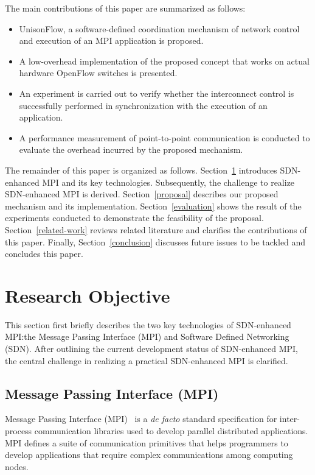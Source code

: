 The main contributions of this paper are summarized as follows:

\begin{itemize}
\item
  UnisonFlow, a software-defined coordination mechanism of network
  control and execution of an MPI application is proposed.
\item
  A low-overhead implementation of the proposed concept that works on
  actual hardware OpenFlow switches is presented.
\item
  An experiment is carried out to verify whether the interconnect
  control is successfully performed in synchronization with the
  execution of an application.
\item
  A performance measurement of point-to-point communication is conducted
  to evaluate the overhead incurred by the proposed mechanism.
\end{itemize}

The remainder of this paper is organized as follows.
Section~\ref{research-objective} introduces SDN-enhanced MPI and its key
technologies. Subsequently, the challenge to realize SDN-enhanced MPI is
derived. Section~\ref{proposal} describes our proposed mechanism and its
implementation. Section~\ref{evaluation} shows the result of the experiments
conducted to demonstrate the feasibility of the proposal.
Section~\ref{related-work} reviews related literature and clarifies the
contributions of this paper. Finally, Section~\ref{conclusion} discusses
future issues to be tackled and concludes this paper.

\hypertarget{research-objective}{%
\section{Research Objective}\label{research-objective}}

This section first briefly describes the two key technologies of
SDN-enhanced MPI:\@ the Message Passing Interface (MPI) and Software
Defined Networking (SDN). After outlining the current development status
of SDN-enhanced MPI, the central challenge in realizing a practical
SDN-enhanced MPI is clarified.

\hypertarget{message-passing-interface-mpi}{%
\subsection{Message Passing Interface
(MPI)}\label{message-passing-interface-mpi}}

Message Passing Interface (MPI)~\autocite{MPIForum2012} is a \emph{de
facto} standard specification for inter-process communication libraries
used to develop parallel distributed applications. MPI defines a suite
of communication primitives that helps programmers to develop
applications that require complex communications among computing nodes.

